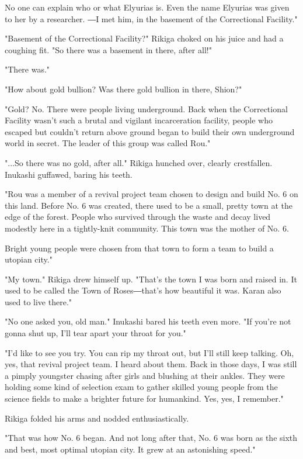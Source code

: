 No one can explain who or what Elyurias is. Even the name Elyurias was
given to her by a researcher. ―I met him, in the basement of the
Correctional Facility."

"Basement of the Correctional Facility?" Rikiga choked on his juice and
had a coughing fit. "So there was a basement in there, after all!"

"There was."

"How about gold bullion? Was there gold bullion in there, Shion?"

"Gold? No. There were people living underground. Back when the
Correctional Facility wasn't such a brutal and vigilant incarceration
facility, people who escaped but couldn't return above ground began to
build their own underground world in secret. The leader of this group
was called Rou."

"...So there was no gold, after all." Rikiga hunched over, clearly
crestfallen. Inukashi guffawed, baring his teeth.

"Rou was a member of a revival project team chosen to design and build
No. 6 on this land. Before No. 6 was created, there used to be a small,
pretty town at the edge of the forest. People who survived through the
waste and decay lived modestly here in a tightly-knit community. This
town was the mother of No. 6.

Bright young people were chosen from that town to form a team to build a
utopian city."

"My town." Rikiga drew himself up. "That's the town I was born and
raised in. It used to be called the Town of Roses―that's how beautiful
it was. Karan also used to live there."

"No one asked you, old man." Inukashi bared his teeth even more. "If
you're not gonna shut up, I'll tear apart your throat for you."

"I'd like to see you try. You can rip my throat out, but I'll still keep
talking. Oh, yes, that revival project team. I heard about them. Back in
those days, I was still a pimply youngster chasing after girls and
blushing at their ankles. They were holding some kind of selection exam
to gather skilled young people from the science fields to make a
brighter future for humankind. Yes, yes, I remember."

Rikiga folded his arms and nodded enthusiastically.

"That was how No. 6 began. And not long after that, No. 6 was born as
the sixth and best, most optimal utopian city. It grew at an astonishing
speed."

